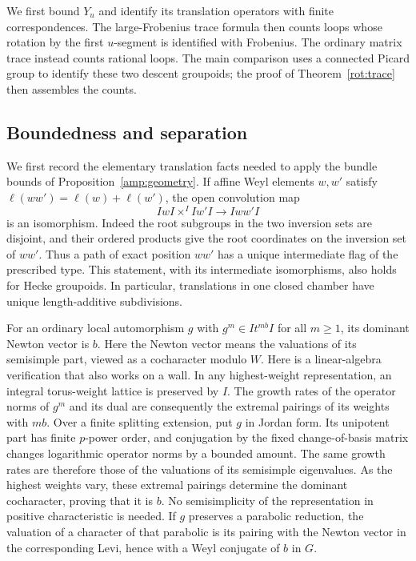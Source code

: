 We first bound $Y_u$ and identify its translation operators with finite
correspondences.  The large-Frobenius trace formula then counts loops
whose rotation by the first $u$-segment is identified with Frobenius.
The ordinary
matrix trace instead counts rational loops.  The main comparison uses
a connected Picard group to identify these two descent groupoids;
the proof of Theorem~\ref{rot:trace} then assembles the counts.

\subsection{Boundedness and separation}

We first record the elementary translation facts needed to apply the
bundle bounds of Proposition~\ref{amp:geometry}.  If affine Weyl elements
$w,w'$ satisfy $\ell(ww')=\ell(w)+\ell(w')$, the open convolution map
\begin{equation}\label{rot:open-product}
 IwI\mathbin{\times^I}Iw'I\longrightarrow Iww'I
\end{equation}
is an isomorphism.  Indeed the root subgroups in the two inversion sets
are disjoint, and their ordered products give the root coordinates on
the inversion set of $ww'$.  Thus a path of exact position $ww'$ has a
unique intermediate flag of the prescribed type.  This statement, with
its intermediate isomorphisms, also holds for Hecke groupoids.  In
particular, translations in one closed chamber have unique
length-additive subdivisions.

For an ordinary local automorphism $g$ with
$g^m\in It^{mb}I$ for all $m\ge1$, its dominant Newton vector is $b$.
Here the Newton vector means the valuations of its semisimple part,
viewed as a cocharacter modulo $W$.  Here is a linear-algebra verification that also works on a wall.
In any highest-weight representation, an integral torus-weight lattice
is preserved by $I$.  The growth rates of the operator norms of $g^m$
and its dual are consequently the extremal pairings of its weights
with $mb$.  Over a finite splitting extension, put $g$ in Jordan form.
Its unipotent part has finite $p$-power order, and conjugation by the
fixed change-of-basis matrix changes logarithmic operator norms by a
bounded amount.  The same growth rates are therefore those of the
valuations of its semisimple eigenvalues.  As the highest weights vary,
these extremal pairings determine the dominant cocharacter, proving
that it is $b$.  No semisimplicity of the representation in positive
characteristic is needed.  If $g$ preserves a parabolic reduction, the valuation
of a character of that parabolic is its pairing with the Newton vector
in the corresponding Levi, hence with a Weyl conjugate of $b$ in $G$.

